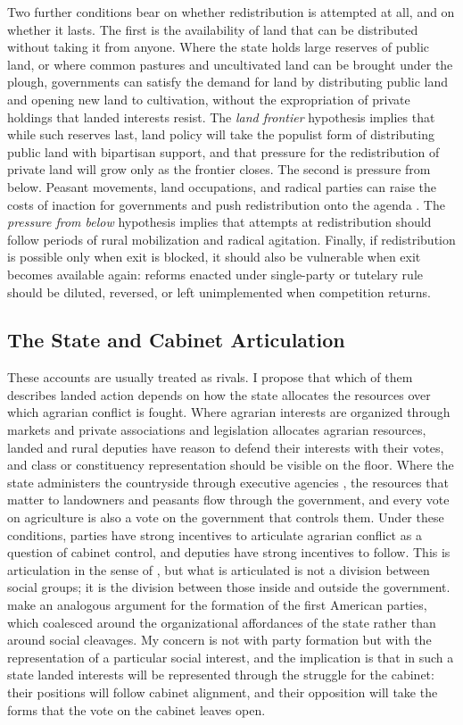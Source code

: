 \documentclass[12pt]{article}
\begin{document}
Two further conditions bear on whether redistribution is attempted at all, and on whether it lasts. The first is the availability of land that can be distributed without taking it from anyone. Where the state holds large reserves of public land, or where common pastures and uncultivated land can be brought under the plough, governments can satisfy the demand for land by distributing public land and opening new land to cultivation, without the expropriation of private holdings that landed interests resist. The \textit{land frontier} hypothesis implies that while such reserves last, land policy will take the populist form of distributing public land with bipartisan support, and that pressure for the redistribution of private land will grow only as the frontier closes. The second is pressure from below. Peasant movements, land occupations, and radical parties can raise the costs of inaction for governments and push redistribution onto the agenda \citep{paige1975,huntington1968}. The \textit{pressure from below} hypothesis implies that attempts at redistribution should follow periods of rural mobilization and radical agitation. Finally, if redistribution is possible only when exit is blocked, it should also be vulnerable when exit becomes available again: reforms enacted under single-party or tutelary rule should be diluted, reversed, or left unimplemented when competition returns.

\subsection*{The State and Cabinet Articulation}

These accounts are usually treated as rivals. I propose that which of them describes landed action depends on how the state allocates the resources over which agrarian conflict is fought. Where agrarian interests are organized through markets and private associations and legislation allocates agrarian resources, landed and rural deputies have reason to defend their interests with their votes, and class or constituency representation should be visible on the floor. Where the state administers the countryside through executive agencies \citep{mann1984,heper1985,keyder1987}, the resources that matter to landowners and peasants flow through the government, and every vote on agriculture is also a vote on the government that controls them. Under these conditions, parties have strong incentives to articulate agrarian conflict as a question of cabinet control, and deputies have strong incentives to follow. This is articulation in the sense of \citet{deleon2009}, but what is articulated is not a division between social groups; it is the division between those inside and outside the government. \citet{rohr2025} make an analogous argument for the formation of the first American parties, which coalesced around the organizational affordances of the state rather than around social cleavages. My concern is not with party formation but with the representation of a particular social interest, and the implication is that in such a state landed interests will be represented through the struggle for the cabinet: their positions will follow cabinet alignment, and their opposition will take the forms that the vote on the cabinet leaves open.
\end{document}
